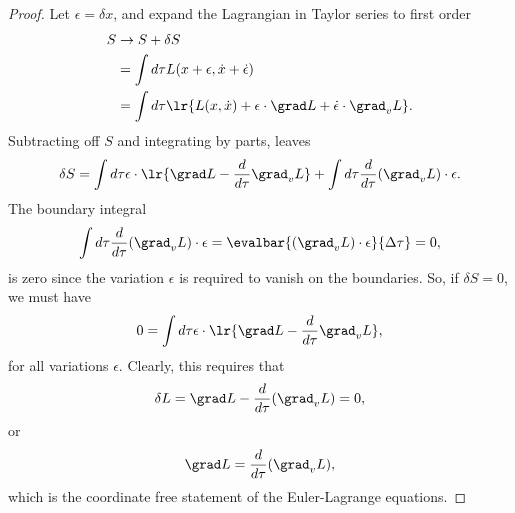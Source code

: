 \begin{proof}
Let \( \epsilon = \delta x \), and expand the
Lagrangian in Taylor series to first order
\begin{equation}\label{eqn:lorentzForceCovariant:60}
\begin{aligned}
S 
&\rightarrow S + \delta S \\
&= \int d\tau L( x + \epsilon, \dot{x} + \dot{\epsilon}) \\
&=
\int d\tau \lr{
   L(x, \dot{x}) + \epsilon \cdot \grad L + \dot{\epsilon} \cdot \grad_v L
}.
\end{aligned}
\end{equation}
Subtracting off \( S \) and integrating by parts, leaves
\begin{equation}\label{eqn:lorentzForceCovariant:80}
\delta S =
\int d\tau \epsilon \cdot \lr{
   \grad L - \frac{d}{d\tau} \grad_v L
}
+
\int d\tau \frac{d}{d\tau} (\grad_v L ) \cdot \epsilon.
\end{equation}
The boundary integral
\begin{equation}\label{eqn:lorentzForceCovariant:100}
\int d\tau \frac{d}{d\tau} (\grad_v L ) \cdot \epsilon
=
\evalbar{(\grad_v L ) \cdot \epsilon}{\Delta \tau} = 0,
\end{equation}
is zero since the variation \( \epsilon \) is required to vanish on the boundaries.  So, if \( \delta S = 0 \), we must have
\begin{equation}\label{eqn:lorentzForceCovariant:120}
0 =
\int d\tau \epsilon \cdot \lr{
   \grad L - \frac{d}{d\tau} \grad_v L
},
\end{equation}
for all variations \( \epsilon \).  Clearly, this requires that
\begin{equation}\label{eqn:lorentzForceCovariant:140}
\delta L = \grad L - \frac{d}{d\tau} (\grad_v L) = 0,
\end{equation}
or
\begin{equation}\label{eqn:lorentzForceCovariant:145}
\grad L = \frac{d}{d\tau} (\grad_v L),
\end{equation}
which is the coordinate free statement of the Euler-Lagrange equations.
\end{proof}
